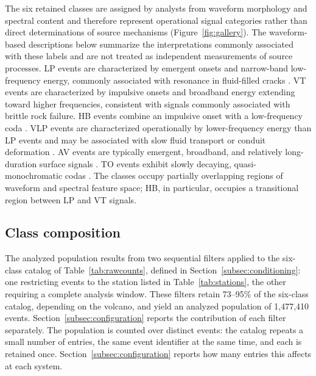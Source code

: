 \documentclass[pdflatex,sn-mathphys-num]{sn-jnl}
\begin{document}
The six retained classes are assigned by analysts from waveform morphology and
spectral content and therefore represent operational signal categories rather
than direct determinations of source mechanisms
(Figure~\ref{fig:gallery}). The waveform-based descriptions below summarize
the interpretations commonly associated with these labels and are not treated
as independent measurements of source processes. LP events are characterized
by emergent onsets and narrow-band low-frequency energy, commonly associated
with resonance in fluid-filled cracks
\cite{chouet_long-period_1996}. VT events are characterized by impulsive
onsets and broadband energy extending toward higher frequencies, consistent
with signals commonly associated with brittle rock failure. HB events combine
an impulsive onset with a low-frequency coda
\cite{white_volcano-tectonic_2016}. VLP events are characterized
operationally by lower-frequency energy than LP events and may be
associated with slow fluid transport or conduit deformation
\cite{almendros_identifying_2002}. AV events are typically emergent,
broadband, and relatively long-duration surface signals
\cite{heck_localization_2019}. TO events exhibit slowly decaying,
quasi-monochromatic codas \cite{gomez_m_tornillo_1999}. The classes occupy
partially overlapping regions of waveform and spectral feature space; HB, in
particular, occupies a transitional region between LP and VT signals.



\subsection{Class composition}\label{subsec:composition}

The analyzed population results from two sequential filters applied to the
six-class catalog of Table~\ref{tab:rawcounts}, defined in
Section~\ref{subsec:conditioning}: one restricting events to the station
listed in Table~\ref{tab:stations}, the other requiring a complete analysis
window. These filters retain 73--95\% of the six-class catalog, depending on
the volcano, and yield an analyzed population of 1{,}477{,}410 events.
Section~\ref{subsec:configuration} reports the contribution of each filter
separately. The population is counted over distinct events: the catalog
repeats a small number of entries, the same event identifier at the same
time, and each is retained once. Section~\ref{subsec:configuration} reports how many
entries this affects at each system.
\end{document}

